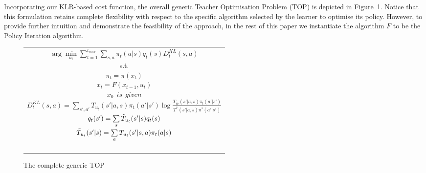 \documentclass[letterpaper]{aamas2010}
\begin{document}
Incorporating our KLR-based cost function, the overall generic Teacher
Optimisation Problem (TOP) is depicted in Figure~\ref{t_opt}. Notice
that this formulation retains complete flexibility with respect to the
specific algorithm selected by the learner to optimise its
policy. However, to provide further intuition and demonstrate the
feasibility of the approach, in the rest of this paper we instantiate the algorithm $F$ to be the
Policy Iteration algorithm.
\begin{figure}[ht]
\begin{tabular}{|c|} \hline \parbox{3.2 in} {\center 
$\arg\min\limits_{u_t}\sum\limits_{t=1}^{t_{max}}\sum\limits_{s,a}\pi_t(a|s)q_t(s)D^{KL}_t(s,a)$\\
s.t.\\
$\pi_t=\pi(x_t)$\\
$x_t=F(x_{t-1},u_t)$\\
$x_0\ \ \displaystyle{is\ \ given}$\\
$D^{KL}_t(s,a)=\sum\limits_{s',a'}T_{u_t}(s'|a,s)\pi_t(a'|s')\log\frac{T_{u_t}(s'|a,s)\pi_t(a'|s')}{T^*(s'|a,s)\pi^*(a'|s')}$\\
$q_t(s')=\sum\limits_s\Tilde{T}_{u_t}(s'|s)q_t(s)$\\
$\Tilde{T}_{u_t}(s'|s)=\sum\limits_aT_{u_t}(s'|s,a)\pi_t(a|s)$\\\ \\
}\\ \hline \end{tabular}
\caption{\label{t_opt}The complete generic TOP}
\end{figure}
\end{document}
